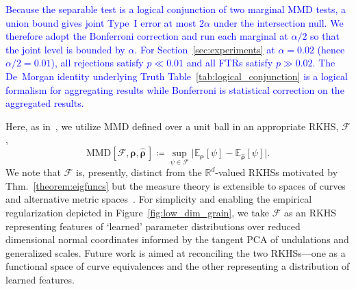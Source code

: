 \documentclass[pdflatex,iicol]{sn-jnl}%
\theoremstyle{thmstyleone}%
\theoremstyle{thmstyletwo}%
\theoremstyle{thmstylethree}%
\begin{document}
\textcolor{blue}{Because the separable test is a logical conjunction of two marginal MMD tests, a union bound gives joint Type~I error at most $2\alpha$ under the intersection null. We therefore adopt the Bonferroni correction and run each marginal at $\alpha/2$ so that the joint level is bounded by $\alpha$. For Section~\ref{sec:experiments} at $\alpha=0.02$ (hence $\alpha/2=0.01$), all rejections satisfy $p\ll 0.01$ and all FTRs satisfy $p\gg 0.02$. The De~Morgan identity underlying Truth Table~\ref{tab:logical_conjunction} is a logical formalism for aggregating results while Bonferroni is statistical correction on the aggregated results.}

Here, as in~\cite{gretton2012kernel}, we utilize MMD defined over a unit ball in an appropriate RKHS, $\mathcal{F}$, 
\begin{equation} \label{eq:MMD}
    \text{MMD}[\mathcal{F},\boldsymbol{\rho},\widehat{\boldsymbol{\rho}}\,] \coloneqq \sup_{\psi \in \mathcal{F}} \vert \mathbb{E}_{\boldsymbol{\rho}}[\psi] - \mathbb{E}_{ \widehat{\boldsymbol{\rho}}}[\psi] \vert.
\end{equation}
We note that $\mathcal{F}$ is, presently, distinct from the $\mathbb{R}^d$-valued RKHSs motivated by Thm.~\ref{theorem:eigfuncs} but the measure theory is extensible to spaces of curves and alternative metric spaces~\cite{zhang2022nonparametric, RizzoDISCO2010}. For simplicity and enabling the empirical regularization depicted in Figure~\ref{fig:low_dim_grain}, we take $\mathcal{F}$ as an RKHS representing features of `learned' parameter distributions over reduced dimensional normal coordinates informed by the tangent PCA of undulations and generalized scales. Future work is aimed at reconciling the two RKHSs---one as a functional space of curve equivalences and the other representing a distribution of learned features.
\end{document}
